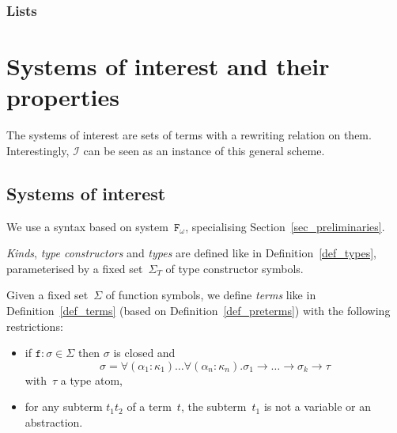 \documentclass[runningheads,a4paper]{llncs}
\newcommand{\Fomega}{\mathtt{F}_\omega}
\newcommand{\Iterms}{\mathcal{I}}
\newcommand{\arrtype}{\rightarrow}
\begin{document}
\subsubsection{Lists}

\section{Systems of interest and their properties}\label{sec:systems}

The systems of interest are sets of terms with a rewriting relation on
them. Interestingly, $\Iterms$ can be seen as an instance of this
general scheme.

\subsection{Systems of interest}

We use a syntax based on system~$\Fomega$, specialising
Section~\ref{sec_preliminaries}.

\begin{definition}\normalfont
  \emph{Kinds}, \emph{type constructors} and \emph{types} are defined
  like in Definition~\ref{def_types}, parameterised by a fixed
  set~$\Sigma_T$ of type constructor symbols.

  Given a fixed set~$\Sigma$ of function symbols, we define
  \emph{terms} like in Definition~\ref{def_terms} (based on
  Definition~\ref{def_preterms}) with the following restrictions:
  \begin{itemize}
  \item if $\mathtt{f} : \sigma \in \Sigma$ then $\sigma$ is closed and
    \[
    \sigma = \forall (\alpha_1 : \kappa_1) \ldots \forall (\alpha_n : \kappa_n)
    . \sigma_1 \arrtype \ldots \arrtype \sigma_k \arrtype \tau
    \]
    with~$\tau$ a type atom,
  \item for any subterm $t_1 t_2$ of a term~$t$, the subterm~$t_1$ is
    not a variable or an abstraction.
  \end{itemize}
\end{definition}
\end{document}
